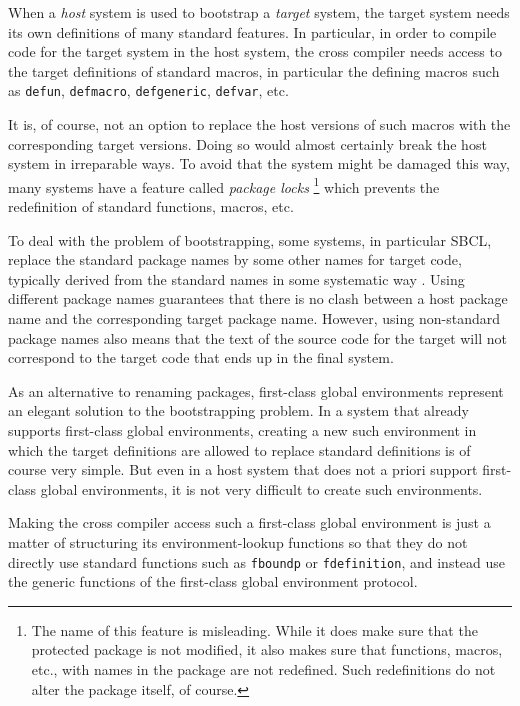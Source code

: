 When a \emph{host} \commonlisp{} system is used to bootstrap a
\emph{target} \commonlisp{} system, the target system needs its own
definitions of many standard \commonlisp{} features.  In particular,
in order to compile code for the target system in the host system, the
cross compiler needs access to the target definitions of standard
\commonlisp{} macros, in particular the defining macros such as
\texttt{defun}, \texttt{defmacro}, \texttt{defgeneric},
\texttt{defvar}, etc.

It is, of course, not an option to replace the host versions of such
macros with the corresponding target versions.  Doing so would almost
certainly break the host system in irreparable ways.  To avoid that
the system might be damaged this way,
many \commonlisp{} systems have a feature called \emph{package locks}%
\footnote{The name of this feature is misleading.  While it does make
  sure that the protected package is not modified, it also makes sure
  that functions, macros, etc., with names in the package are not
  redefined.  Such redefinitions do not alter the package itself, of
  course.}
which prevents the redefinition of standard \commonlisp{} functions,
macros, etc.

To deal with the problem of bootstrapping, some systems, in particular
SBCL, replace the standard package names by some other names for
target code, typically derived from the standard names in some
systematic way \cite{Rhodes:2008:SSC:1482373.1482380}.  Using
different package names guarantees that there is no clash between a
host package name and the corresponding target package name.  However,
using non-standard package names also means that the text of the
source code for the target will not correspond to the target code that
ends up in the final system.

As an alternative to renaming packages, first-class global
environments represent an elegant solution to the bootstrapping
problem.  In a system that already supports first-class global
environments, creating a new such environment in which the target
definitions are allowed to replace standard \commonlisp{} definitions
is of course very simple.  But even in a host system that does not a
priori support first-class global environments, it is not very
difficult to create such environments.

Making the cross compiler access such a first-class global environment
is just a matter of structuring its environment-lookup functions so
that they do not directly use standard \commonlisp{} functions such as
\texttt{fboundp} or \texttt{fdefinition}, and instead use the generic
functions of the first-class global environment protocol.

